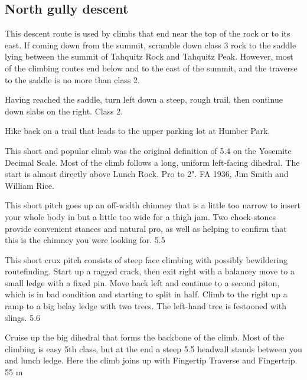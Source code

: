 \documentclass{tahquitz}
\begin{document}
\subsection{North gully descent}\label{subsec:north-gully-descent}

This descent route is used by climbs that end near the top of the rock
or to its east. If coming down from the summit, scramble down class 3
rock to the saddle lying between the summit of Tahquitz Rock and
Tahquitz Peak. However, most of the climbing routes end below and to
the east of the summit, and the traverse to the saddle is no more than
class 2.

Having reached the saddle, turn left down a steep, rough trail, then continue down slabs on the right.
Class 2.

Hike back on a trail that leads to the upper parking lot at Humber Park.



\normalparindent





This short and popular climb was the original definition of 5.4 on the Yosemite Decimal Scale.
Most of the climb follows a long, uniform left-facing dihedral.
The start is almost directly above Lunch Rock. Pro to 2". FA
1936, Jim Smith and William Rice.

 This short pitch goes up an off-width chimney that is a little too
narrow to insert your whole body in but a little too wide for a thigh jam.
Two chock-stones provide convenient stances and natural pro, as well as helping
to confirm that this is the chimney you were looking for. 5.5

 This short crux pitch consists of steep face climbing with
possibly bewildering routefinding. Start up a ragged crack, then
exit right with a balancey move to a small ledge with a fixed pin.
Move back left and continue to a second piton, which is in bad condition
and starting to split in half. Climb to the right up a ramp to a big belay
ledge with two trees. The left-hand tree is festooned with slings. 5.6

 Cruise up the big dihedral that forms the backbone of the climb.
Most of the climbing is easy 5th class, but at the end a steep 5.5 headwall
stands between you and lunch ledge. Here the climb joins up with Fingertip Traverse
and Fingertrip. 55 m
\end{document}
